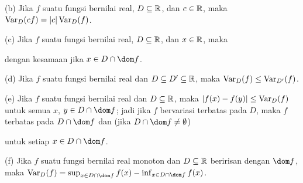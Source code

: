 (b) Jika $f$ suatu fungsi bernilai real, $D\subseteq\Bbb R$, dan
$c\in\Bbb R$, maka $\mathop{\text{Var}}_{D}(cf)=|c|\mathop{\text{Var}}_{D}(f)$.

(c) Jika $f$ suatu fungsi bernilai real, $D\subseteq\Bbb R$, dan
$x\in \Bbb R$, maka


\noindent dengan kesamaan jika $x\in D\cap\dom f$.

(d) Jika $f$ suatu fungsi bernilai real dan
$D\subseteq D'\subseteq\Bbb R$, maka $\mathop{\text{Var}}_D(f)\le\mathop{\text{Var}}_{D'}(f)$.

(e) Jika $f$ suatu fungsi bernilai real dan $D\subseteq\Bbb R$, maka
$|f(x)-f(y)|\le\mathop{\text{Var}}_D(f)$ untuk semua $x$, $y\in D\cap\dom f$; jadi jika
$f$ bervariasi terbatas pada $D$, maka $f$ terbatas pada $D\cap\dom f$ dan
(jika $D\cap\dom f\ne\emptyset$)


\noindent untuk setiap $x\in D\cap\dom f$.

(f) Jika $f$ suatu fungsi bernilai real monoton dan $D\subseteq\Bbb R$
beririsan dengan $\dom f$, maka
\discrcenter{468pt}
{$\Var_D(f)=\sup_{x\in D\cap\dom f}f(x)-\inf_{x\in D\cap\dom f}f(x)$.}

